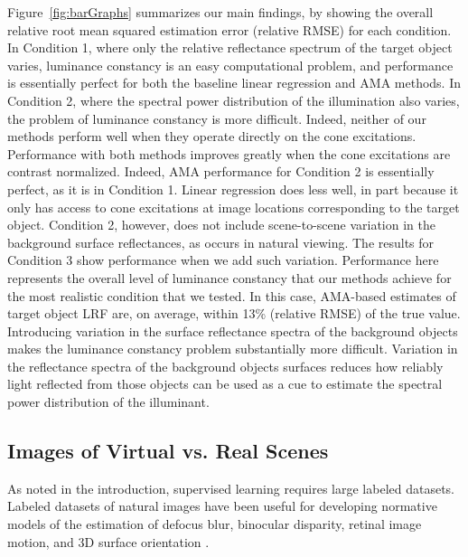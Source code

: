 \documentclass{jov}
\begin{document}
Figure~\ref{fig:barGraphs} summarizes our main findings, by showing the overall relative root mean squared estimation error (relative RMSE) for each condition. 
In Condition 1, where only the relative reflectance spectrum of the target object varies, 
luminance constancy is an easy computational problem,
and performance is essentially perfect for both the baseline linear regression and AMA methods.
In Condition 2, where the spectral power distribution of the illumination also varies, the problem of luminance constancy is more difficult.
Indeed, neither of our methods perform well when they operate directly on the cone excitations.
Performance with both methods improves greatly when the cone excitations are contrast normalized. 
Indeed, AMA performance for Condition 2 is essentially perfect, as it is in Condition 1.
Linear regression does less well, in part because it only has access to cone excitations at image locations
corresponding to the target object.
Condition 2, however, does not include scene-to-scene variation in the background surface reflectances,
as occurs in natural viewing.
The results for Condition 3 show performance when we add such variation.
Performance here represents the overall level of luminance constancy that our methods achieve for the
most realistic condition that we tested.
In this case, AMA-based estimates of target object LRF are, on average, within 13\% (relative RMSE) of the true value.
Introducing variation in the surface reflectance spectra of the background objects makes 
the luminance constancy problem substantially more difficult. 
Variation in the reflectance spectra of the background objects surfaces reduces how 
reliably light reflected from those objects can be used as a cue to estimate the spectral power distribution of the illuminant.

\subsection{Images of Virtual vs. Real Scenes}
As noted in the introduction, supervised learning requires large labeled datasets. Labeled datasets of natural images have been useful for developing normative models of the estimation of defocus blur, binocular disparity, retinal image motion, and 3D surface orientation \cite{burge2011optimal, burge2012optimal, burge2014optimal, burge2015optimal, sebastian2015defocus, kim2018lawful, burge2010natural, girshick2011cardinal, burge2016estimating, goncalves2017not}. 
\end{document}
